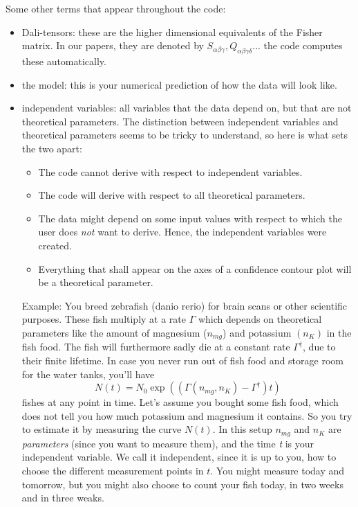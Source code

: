 \documentclass[12pt,twoside]{extarticle}
\begin{document}
Some other terms that appear throughout the code:
\begin{itemize}
 \item Dali-tensors: these are the higher dimensional equivalents of the Fisher matrix. In our papers, they are denoted by $S_{\alpha\beta\gamma}, Q_{\alpha\beta\gamma\delta}$... the code computes these automatically.
 \item the model: this is your numerical prediction of how the data will look like.
\item independent variables: all variables that the data depend on, but that are not theoretical parameters. The distinction between independent variables and theoretical parameters seems to be tricky to understand, so here is what sets the two apart:
\begin{itemize}
\item The code cannot derive with respect to independent variables.
\item The code will derive with respect to all theoretical parameters.
\item The data might depend on some input values with respect to which the user does \emph{not} want to derive. Hence, the independent variables were created.
\item Everything that shall appear on the axes of a confidence contour plot will be a theoretical parameter.
\end{itemize}
Example: You breed zebrafish (danio rerio) for brain scans or other scientific purposes. These fish multiply at a rate $\Gamma$ which depends on theoretical parameters like the amount of magnesium ($n_{mg}$) and potassium $(n_K)$ in the fish food. The fish will furthermore sadly die at a constant rate $\Gamma^\dagger$, due to their finite lifetime. In case you never run out of fish food and storage room for the water tanks, you'll have $$N(t) = N_0 \exp\left((\Gamma(n_{mg},n_K) -\Gamma^\dagger) t\right)$$ fishes at any point in time. Let's assume you bought some fish food, which does not tell you how much potassium and magnesium it contains. So you try to estimate it by measuring the curve $N(t)$. In this setup $n_{mg}$ and $n_K$ are \emph{parameters} (since you want to measure them), and the time \emph{t} is your independent variable. We 
call it independent, since it is up to you, how to choose the different measurement points in $t$. You might measure today and tomorrow, but you might also choose to count your fish today, in two weeks and in three weaks.

\end{itemize}
\end{document}
